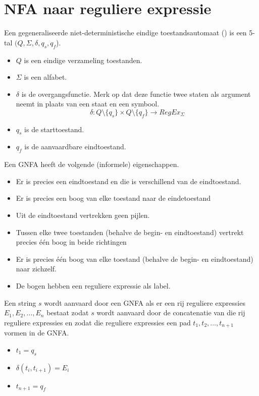 \documentclass[main.tex]{subfiles}
\begin{document}
\section{NFA naar reguliere expressie}
\begin{de}
  Een gegeneraliseerde niet-deterministische eindige toestandsautomaat () is een 5-tal $(Q,\Sigma,\delta,q_{s},q_{f}$).
  \begin{itemize}
  \item $Q$ is een eindige verzameling toestanden.
  \item $\Sigma$ is een alfabet.
  \item $\delta$ is de overgangsfunctie.
  Merk op dat deze functie twee staten als argument neemt in plaats van een staat en een symbool.
    \[
    \delta: Q\setminus\{q_{s}\} \times Q\setminus\{q_{f}\} \rightarrow RegEx_{\Sigma}
    \]
  \item $q_{s}$ is de starttoestand.
  \item $q_{f}$ is de aanvaardbare eindtoestand.
  \end{itemize}
  Een GNFA heeft de volgende (informele) eigenschappen.
  \begin{itemize}
  \item Er is precies een eindtoestand en die is verschillend van de eindtoestand.
  \item Er is precies een boog van elke toestand naar de eindetoestand
  \item Uit de eindtoestand vertrekken geen pijlen.
  \item Tussen elke twee toestanden (behalve de begin- en eindtoestand) vertrekt precies \'e\'en boog in beide richtingen
  \item Er is precies \'e\'en boog van elke toestand (behalve de begin- en eindtoestand) naar zichzelf.
  \item De bogen hebben een reguliere expressie als label.
  \end{itemize}
\end{de}

\begin{de}
  Een string $s$ wordt aanvaard door een GNFA als er een rij reguliere expressies $E_{1},E_{2},\dotsc,E_{n}$ bestaat zodat $s$ wordt aanvaard door de concatenatie van die rij reguliere expressies en zodat die reguliere expressies een pad $t_{1},t_{2},\dotsc,t_{n+1}$ vormen in de GNFA. 
  \begin{itemize}
  \item $t_{1} = q_{s}$
  \item $\delta(t_{i},t_{i+1}) = E_{i}$
  \item $t_{n+1} = q_{f}$
  \end{itemize}
\end{de}
\end{document}
